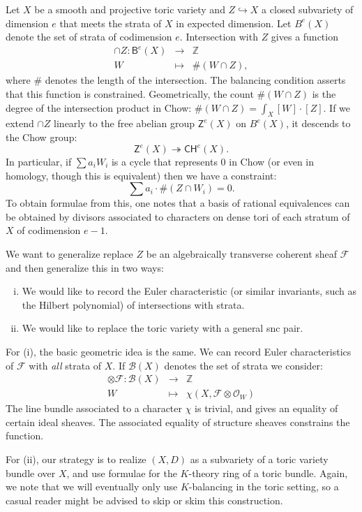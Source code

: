 \documentclass[11pt]{amsart}
\theoremstyle{definition}
\theoremstyle{definition}
\begin{document}
Let $X$ be a smooth and projective toric variety and $Z\hookrightarrow X$ a closed subvariety of dimension $e$ that meets the strata of $X$ in expected dimension. Let $B^e(X)$ denote the set of strata of codimension $e$. Intersection with $Z$ gives a function
\begin{eqnarray*}
\cap Z\colon \mathsf B^e(X)&\to& \mathbb Z\\
W&\mapsto& \#(W\cap Z),
\end{eqnarray*}
where $\#$ denotes the length of the intersection. The balancing condition asserts that this function is constrained. Geometrically, the count $ \#(W\cap Z)$ is the degree of the intersection product in Chow: $\#(W\cap Z) = \int_X [W]\cdot [Z]$. If we extend $\cap Z$ linearly to the free abelian group $\mathsf Z^e(X)$ on $B^e(X)$, it descends to the Chow group:
\[
\mathsf{Z}^e(X)\twoheadrightarrow \mathsf{CH}^e(X).
\]
In particular, if $\sum a_i W_i$ is a cycle that represents $0$ in Chow (or even in homology, though this is equivalent) then we have a constraint:
\[
\sum a_i\cdot \#(Z\cap W_i) = 0.
\]
To obtain formulae from this, one notes that a basis of rational equivalences can be obtained by divisors associated to characters on dense tori of each stratum of $X$ of codimension $e-1$. 

We want to generalize replace $Z$ be an algebraically transverse coherent sheaf $\mathcal F$ and then generalize this in two ways:
\begin{enumerate}[(i)]
\item We would like to record the Euler characteristic (or similar invariants, such as the Hilbert polynomial) of intersections with strata.
\item We would like to replace the toric variety with a general snc pair. 
\end{enumerate}

For (i), the basic geometric idea is the same. We can record Euler characteristics of $\mathcal F$ with {\it all} strata of $X$. If  $\mathcal B(X)$ denotes the set of strata we consider:
\begin{eqnarray*}
\otimes \mathcal F\colon \mathcal B(X)&\to& \mathbb Z\\
W&\mapsto& \chi(X, \mathcal F \otimes \mathcal O_W)
\end{eqnarray*}
The line bundle associated to a character $\chi$ is trivial, and gives an equality of certain ideal sheaves. The associated equality of structure sheaves constrains the function.

For (ii), our strategy is to realize $(X,D)$ as a subvariety of a toric variety bundle over $X$, and use formulae for the $K$-theory ring of a toric bundle. Again, we note that we will eventually only use $K$-balancing in the toric setting, so a casual reader might be advised to  skip or skim this construction. 
\end{document}
